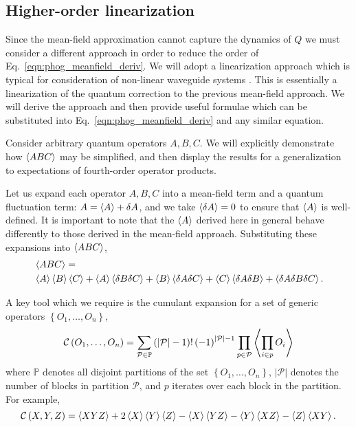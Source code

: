 \subsection{Higher-order linearization}\label{sec:linearization}
Since the mean-field approximation cannot capture the dynamics of $Q$ we must consider a different approach in order to reduce the order of Eq.~\ref{eqn:phog_meanfield_deriv}. We will adopt a linearization approach which is typical for consideration of non-linear waveguide systems \cite{Doerr1994, Haus1990,Ju2012}. This is essentially a linearization of the quantum correction to the previous mean-field approach. We will derive the approach and then provide useful formulae which can be substituted into Eq.~\ref{eqn:phog_meanfield_deriv} and any similar equation. 

Consider arbitrary quantum operators $A, B, C$. We will explicitly demonstrate how $\ev{ABC}$ may be simplified, and then display the results for a generalization to expectations of fourth-order operator products. 

Let us expand each operator $A, B, C$ into a mean-field term and a quantum fluctuation term: $A = \ev{A} + \delta A$, and we take $\ev{\delta A} = 0$ to ensure that $\ev{A}$ is well-defined. It is important to note that the $\ev{A}$ derived here in general behave differently to those derived in the mean-field approach. Substituting these expansions into $\ev{A B C}$,
\begin{align}\label{eqn:phog_linearization_deriv}
&\ev{A B C} = \notag \\
%
&\ev{A}\ev{B}\ev{C} + \ev{A}\ev{\delta B \delta C} + \ev{B} \ev{\delta A \delta C} + \ev{C} \ev{\delta A \delta B} + \ev{\delta A \delta B \delta C}.
\end{align}

\noindent A key tool which we require is the cumulant expansion \cite{mathworld_cumulant} for a set of generic operators $\left\{ O_1, \dots, O_n\right\}$, 
\begin{equation}
\mathcal{C}\left(O_1, \dots, O_n\right) = \sum_{\mathcal{P}\in \mathbb{P}} \left(\left|\mathcal{P}\right| - 1\right)! \left(-1\right)^{\left|\mathcal{P}\right|-1} \prod_{p \in \mathcal{P}} \ev{\prod_{i \in p} O_i}
\end{equation}
where $\mathbb{P}$ denotes all disjoint partitions of the set $\left\{O_1, \dots, O_n\right\}$, $\left| \mathcal{P}\right|$ denotes the number of blocks in partition $\mathcal{P}$, and $p$ iterates over each block in the partition. For example,
\begin{equation}
\mathcal{C} \left(X, Y, Z\right) = \ev{X Y Z} + 2 \ev{X}\ev{Y}\ev{Z} - \ev{X}\ev{Y Z} - \ev{Y}\ev{X Z} - \ev{Z}\ev{X Y}.
\end{equation}

